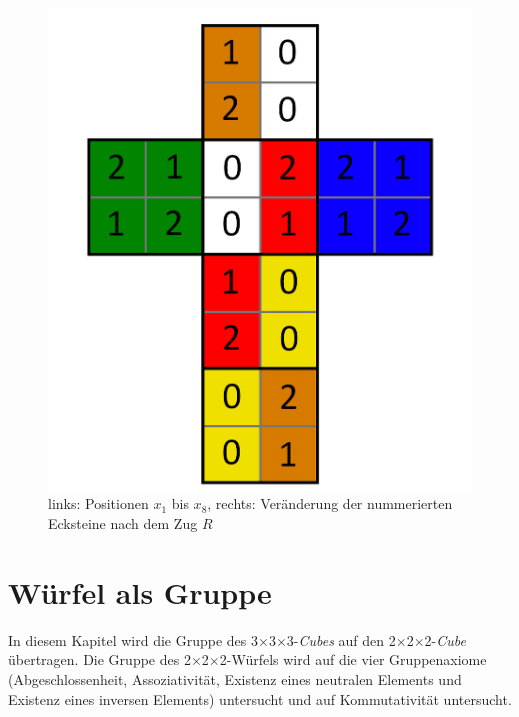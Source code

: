\documentclass[12pt,a4paper, usenames, dvipsnames]{article}
\theoremstyle{mystyle}
\theoremstyle{definition}
\newcommand{\Ttwo}{2$\times$2$\times$2-}
\newcommand{\Tthree}{3$\times$3$\times$3-}
\begin{document}
\begin{figure}[h]
\includegraphics[scale=0.1]{foldedout_012_spin.png}
\caption[links: Positionen $x_1$ bis $x_8$, rechts: Veränderung der nummerierten Ecksteine nach dem Zug $R$]{links: Positionen $x_1$ bis $x_8$, rechts: Veränderung der nummerierten Ecksteine nach dem Zug $R$}
\label{7}
\end{figure}

%
%
%
%
%
%
%
%
%
%
\newpage
\section{Würfel als Gruppe}

In diesem Kapitel wird die Gruppe des \Tthree \textit{Cubes} auf den \Ttwo \textit{Cube} übertragen. Die Gruppe des \Ttwo Würfels wird auf die vier Gruppenaxiome (Abgeschlossenheit, Assoziativität, Existenz eines neutralen Elements und Existenz eines inversen Elements) untersucht und auf Kommutativität untersucht.

%
%
%
%
%
%
%
%
%
%
\end{document}
